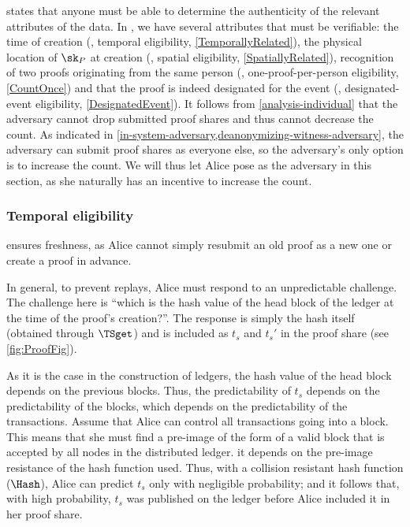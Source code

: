  states that anyone must be able to determine the authenticity of the relevant attributes of the data.
In \CROCUS, we have several attributes that must be verifiable: the time of 
creation (\ie, temporal eligibility, \cref{TemporallyRelated}), the physical 
location of \(\sk_P\) at creation (\ie, spatial eligibility, 
\cref{SpatiallyRelated}), recognition of two proofs originating from the same 
person (\ie, one-proof-per-person eligibility, \cref{CountOnce}) and that the 
proof is indeed designated for the event (\ie, designated-event eligibility, 
\cref{DesignatedEvent}).
It follows from \cref{analysis-individual} that the adversary cannot drop 
submitted proof shares and thus cannot decrease the count.
As indicated in \cref{in-system-adversary,deanonymizing-witness-adversary}, the 
adversary can submit proof shares as everyone else, so the adversary's only 
option is to increase the count.
We will thus let Alice pose as the adversary in this section, as she naturally 
has an incentive to increase the count.

\subsubsection{Temporal eligibility}%
\label{analysis-temporal}

 ensures freshness, as Alice cannot simply resubmit an 
old proof as a new one or create a proof in advance.

In general, to prevent replays, Alice must respond to an unpredictable 
challenge.
The challenge here is \enquote{which is the hash value of the head block of the 
  ledger at the time of the proof's creation?}.
The response is simply the hash itself (obtained through \(\TSget\)) and is 
included as \(t_s\) and \(t_s'\) in the proof share (see \cref{fig:ProofFig}).

As it is the case in the construction of ledgers, the hash value of the head 
block depends on the previous blocks.
Thus, the predictability of \(t_s\) depends on the predictability of the 
blocks, which depends on the predictability of the transactions.
Assume that Alice can control all transactions going into a block.
This means that she must find a pre-image of the form of a valid block that is 
accepted by all nodes in the distributed ledger.
\Ie it depends on the pre-image resistance of the hash function used.
Thus, with a collision resistant hash function (\(\Hash\)), Alice can predict 
\(t_s\) only with negligible probability; and it follows that, with high 
probability, \(t_s\) was published on the ledger before Alice included it in 
her proof share.

